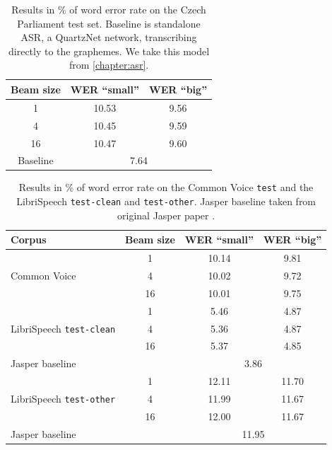 \begin{table}[h]
	\centering
	\begin{tabular}{c|cc}
		\bf Beam size & \bf WER ``small''& \bf WER ``big'' \\
		\hline
		1    &    10.53 & 9.56    \\
		4    &    10.45& 9.59    \\
		16    &    10.47& 9.60\\
		Baseline & \multicolumn{2}{c}{7.64} 
		
	\end{tabular}
	
	\caption{Results in \% of word error rate on the Czech Parliament test set. Baseline is standalone ASR, a QuartzNet network, transcribing directly to the graphemes. We take this model from \cref{chapter:asr}.}
	\label{tab:phon_cs}
\end{table}


\begin{table}[H]
	\centering
	\begin{tabular}{lc|cc}
		\bf Corpus & \bf Beam size & \bf WER ``small''& \bf WER ``big'' \\
		\hline
		\multirow{3}{*}{Common Voice}    & 1    &10.14    &    9.81    \\
		& 4    & 10.02    &    9.72    \\
		& 16    &10.01    & 9.75    \\
		\hline
		
		\multirow{3}{*}{LibriSpeech \texttt{test-clean}}    & 1    &    5.46 &    4.87    \\
		& 4    &  5.36 &    4.87    \\
		& 16     &5.37    & 4.85    \\
		\multicolumn{2}{l|}{Jasper baseline} & \multicolumn{2}{c}{3.86} \\
		\hline
		
		\multirow{3}{*}{LibriSpeech \texttt{test-other}}    & 1    &    12.11 &11.70    \\
		& 4    &11.99     &    11.67    \\
		& 16    & 12.00     & 11.67    \\
		\multicolumn{2}{l|}{Jasper baseline} & \multicolumn{2}{c}{11.95} \\
		
	\end{tabular}
	
	\caption{Results in \% of word error rate on the Common Voice \texttt{test} and the LibriSpeech \texttt{test-clean} and \texttt{test-other}. Jasper baseline taken from original Jasper paper .}
	\label{tab:phon_en}
\end{table}


